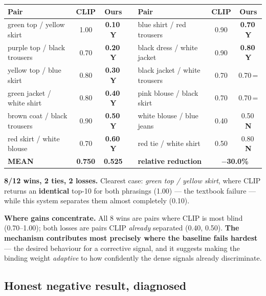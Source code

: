 \documentclass[10pt,a4paper]{article}
\newcommand{\swWin}{\textbf{Y}}
\newcommand{\swTie}{=}
\newcommand{\swLoss}{\textbf{N}}
\begin{document}
\begin{center}\small
\begin{tabularx}{\textwidth}{@{}Xccp{0.5cm}@{\hspace{4pt}}Xcc@{}}
\toprule
\textbf{Pair} & \textbf{CLIP} & \textbf{Ours} & & \textbf{Pair} & \textbf{CLIP} & \textbf{Ours} \\
\midrule
green top / yellow skirt      & 1.00 & \textbf{0.10}\,\swWin & & blue shirt / red trousers     & 0.90 & \textbf{0.70}\,\swWin \\
purple top / black trousers   & 0.70 & \textbf{0.20}\,\swWin & & black dress / white jacket    & 0.90 & \textbf{0.80}\,\swWin \\
yellow top / blue skirt       & 0.80 & \textbf{0.30}\,\swWin & & black jacket / white trousers & 0.70 & 0.70\,\swTie \\
green jacket / white shirt    & 0.80 & \textbf{0.40}\,\swWin & & pink blouse / black skirt     & 0.70 & 0.70\,\swTie \\
brown coat / black trousers   & 0.90 & \textbf{0.50}\,\swWin & & white blouse / blue jeans     & 0.40 & 0.50\,\swLoss \\
red skirt / white blouse      & 0.70 & \textbf{0.60}\,\swWin & & red tie / white shirt         & 0.50 & 0.80\,\swLoss \\
\midrule
\textbf{MEAN} & \textbf{0.750} & \textbf{0.525} & & \textbf{relative reduction} & \multicolumn{2}{c}{\textbf{$-$30.0\%}} \\
\bottomrule
\end{tabularx}
\end{center}

\textbf{8/12 wins, 2 ties, 2 losses.} Clearest case: \emph{green top / yellow skirt}, where CLIP
returns an \textbf{identical} top-10 for both phrasings (1.00) --- the textbook failure --- while
this system separates them almost completely (0.10).

\textbf{Where gains concentrate.} All 8 wins are pairs where CLIP is most blind (0.70--1.00); both
losses are pairs CLIP \emph{already} separated (0.40, 0.50). \textbf{The mechanism contributes most
precisely where the baseline fails hardest} --- the desired behaviour for a corrective signal, and
it suggests making the binding weight \emph{adaptive} to how confidently the dense signals already
discriminate.

\subsection{Honest negative result, diagnosed}
\end{document}
